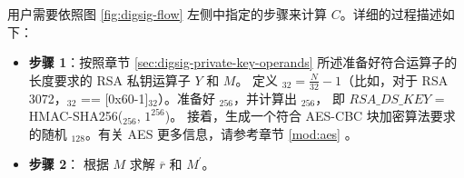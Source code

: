 \documentclass[main\_\_CN.tex]{subfiles}
\begin{document}
用户需要依照图 \ref{fig:digsig-flow} 左侧中指定的步骤来计算 \begin{math}C\end{math}。详细的过程描述如下：

\begin{itemize}

    \item {\bfseries 步骤 1}：按照章节 \ref{sec:digsig-private-key-operands} 所述准备好符合运算子的长度要求的 RSA 私钥运算子 \begin{math}Y\end{math} 和 \begin{math}M\end{math}。
          定义 \begin{math}[L]_{32} = \frac{N}{32}-1 \end{math}（比如，对于 RSA 3072，\begin{math}[L]_{32}\end{math} == [0x60-1]\begin{math}_{32}\end{math}）。准备好 \begin{math}[HMAC\_KEY]_{256}\end{math}，并计算出 \begin{math}[RSA\_DS\_KEY]_{256}\end{math}， 即 \begin{math}RSA\_DS\_KEY\end{math} = HMAC-SHA256(\begin{math}[HMAC\_KEY]_{256}\end{math}, \begin{math}1^{256}\end{math})。 接着，生成一个符合 AES-CBC 块加密算法要求的随机 \begin{math}[IV]_{128}\end{math}。有关 AES 更多信息，请参考章节 \ref{mod:aes} \textit{}。 
    
    \item {\bfseries 步骤 2}：
          根据 \begin{math}M\end{math} 求解 \begin{math}\overline{r}\end{math} 和 \begin{math}M^{\prime} \end{math}。
    

\end{itemize}
\end{document}
